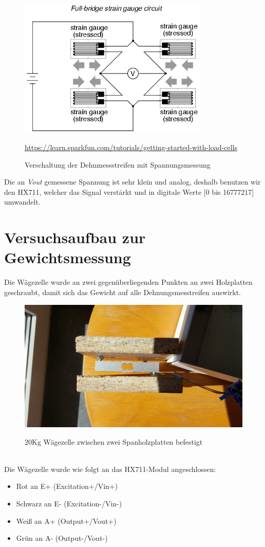 \begin{figure}[ht]
    \center
    \includegraphics[width=9cm]{Bilder/waegezelle-full.png}\\
    \caption{Verschaltung der Dehnmessstreifen mit Spannungsmessung}
    \begin{flushleft} \quelle\url{https://learn.sparkfun.com/tutorials/getting-started-with-load-cells} \end{flushleft}
\end{figure}
\noindent
Die an \textit{Vout} gemessene Spannung ist sehr klein und analog, deshalb benutzen wir den HX711, welcher das Signal verstärkt und in digitale Werte [0 bis 16777217] umwandelt. 
\newpage


\section{Versuchsaufbau zur Gewichtsmessung}
Die Wägezelle wurde an zwei gegenüberliegenden Punkten an zwei Holzplatten geschraubt, damit sich das Gewicht auf alle Dehnungsmesstreifen auswirkt.\\
\begin{figure}[ht]
    \center
    \includegraphics[width=15cm]{Bilder/waegezelle.jpg}\\
    \caption{20Kg Wägezelle zwischen zwei Spanholzplatten befestigt}
\end{figure}\\
Die Wägezelle wurde wie folgt an das HX711-Modul angeschlossen: 
\begin{itemize}
    \item Rot an E+ (Excitation+/Vin+) 
    \item Schwarz an E- (Excitation-/Vin-) 
    \item Weiß an A+ (Output+/Vout+) 
    \item Grün an A- (Output-/Vout-) 
\end{itemize}

